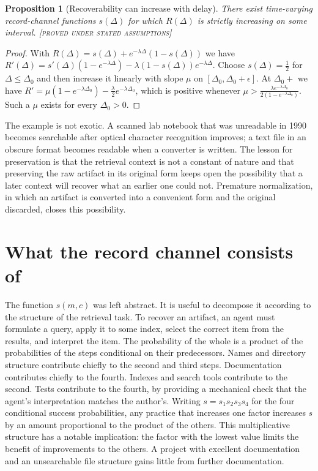 \documentclass[11pt,twoside,openright]{book}
\theoremstyle{plain}
\newtheorem{proposition}[theorem]{Proposition}
\theoremstyle{definition}
\theoremstyle{remark}
\newcommand{\Proved}{\textup{\textsc{[proved under stated assumptions]}}}
\begin{document}
\begin{proposition}[Recoverability can increase with delay]\label{prop:increase}
There exist time-varying record-channel functions $s(\Delta)$ for which $R(\Delta)$ is strictly increasing on some interval.
\Proved{}
\end{proposition}

\begin{proof}
With $R(\Delta)=s(\Delta)+e^{-\lambda\Delta}(1-s(\Delta))$ we have $R'(\Delta)=s'(\Delta)(1-e^{-\lambda\Delta})-\lambda(1-s(\Delta))e^{-\lambda\Delta}$. Choose $s(\Delta)=\tfrac12$ for $\Delta\le\Delta_0$ and then increase it linearly with slope $\mu$ on $[\Delta_0,\Delta_0+\epsilon]$. At $\Delta_0+$ we have $R'=\mu(1-e^{-\lambda\Delta_0})-\tfrac{\lambda}{2}e^{-\lambda\Delta_0}$, which is positive whenever $\mu>\tfrac{\lambda e^{-\lambda\Delta_0}}{2(1-e^{-\lambda\Delta_0})}$. Such a $\mu$ exists for every $\Delta_0>0$.
\end{proof}

The example is not exotic. A scanned lab notebook that was unreadable in 1990 becomes searchable after optical character recognition improves; a text file in an obscure format becomes readable when a converter is written. The lesson for preservation is that the retrieval context is not a constant of nature and that preserving the raw artifact in its original form keeps open the possibility that a later context will recover what an earlier one could not. Premature normalization, in which an artifact is converted into a convenient form and the original discarded, closes this possibility.

\section{What the record channel consists of}

The function $s(m,c)$ was left abstract. It is useful to decompose it according to the structure of the retrieval task. To recover an artifact, an agent must formulate a query, apply it to some index, select the correct item from the results, and interpret the item. The probability of the whole is a product of the probabilities of the steps conditional on their predecessors. Names and directory structure contribute chiefly to the second and third steps. Documentation contributes chiefly to the fourth. Indexes and search tools contribute to the second. Tests contribute to the fourth, by providing a mechanical check that the agent's interpretation matches the author's. Writing $s=s_1s_2s_3s_4$ for the four conditional success probabilities, any practice that increases one factor increases $s$ by an amount proportional to the product of the others. This multiplicative structure has a notable implication: the factor with the lowest value limits the benefit of improvements to the others. A project with excellent documentation and an unsearchable file structure gains little from further documentation.
\end{document}
